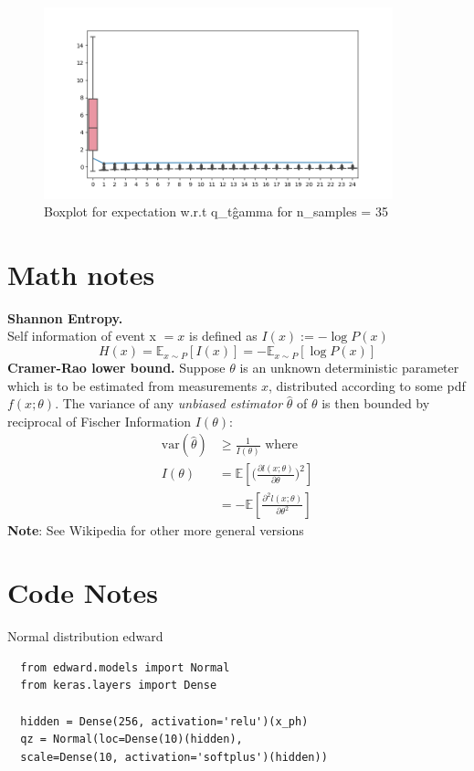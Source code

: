 \documentclass[letterpaper]{article}
\newcommand{\EE}[1]{\mathbb{E}\left[#1\right]}
\newcommand{\EEE}[2]{\mathbb{E}_{#1}\left[#2\right]}
\newcommand{\mypar}[1]{{\bf #1.}}
\begin{document}
  \begin{figure}[h] \label{fig:eq35}
  \centering
  \includegraphics[width=0.9\textwidth]{plots/box_e_q_35.png}
  \caption{Boxplot for expectation w.r.t q\_t\^gamma for n\_samples = 35}
  \end{figure}
  \newpage
  \section{Math notes}
  \mypar{Shannon Entropy} \\
  Self information of event x $= x$ is defined as $I(x) := -\log P(x)$
  $$
  H(x) = \EEE{x \sim P}{I(x)} = -\EEE{x \sim P}{\log P(x)}
  $$
  \mypar{Cramer-Rao lower bound} \cite{math-stat16} 
  Suppose $\theta$ is an unknown deterministic parameter which is to be estimated from
  measurements $x$, distributed according to some pdf $f(x; \theta)$. The variance of any 
  \textit{unbiased estimator} $\hat{\theta}$ of $\theta$ is then bounded by reciprocal of
  Fischer Information $I(\theta)$:
  \begin{align}
    \text{var}(\hat{\theta}) &\geq \frac{1}{I(\theta)} \text{ where }\nonumber\\
    I(\theta) &= \EE{\Big(\frac{\partial l(x; \theta)}{\partial \theta}\Big)^2} \nonumber\\
         &= -\EE{\frac{\partial^2 l(x; \theta)}{\partial \theta^2}} \nonumber
  \end{align}
  {\bf Note}: See Wikipedia for other more general versions


  \newpage
  \section{Code Notes}
  Normal distribution edward

  \begin{verbatim}
  from edward.models import Normal
  from keras.layers import Dense
  
  hidden = Dense(256, activation='relu')(x_ph)
  qz = Normal(loc=Dense(10)(hidden),
  scale=Dense(10, activation='softplus')(hidden))
  \end{verbatim}
  
\end{document}

